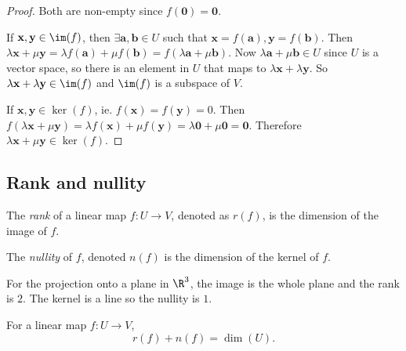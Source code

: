 \documentclass[a4paper]{article}
\begin{document}
\begin{proof}
  Both are non-empty since $f(\mathbf{0}) = \mathbf{0}$.

  If $\mathbf{x, y}\in \im (f)$, then $\exists \mathbf{a, b}\in U$ such that $\mathbf{x} = f(\mathbf{a}), \mathbf{y} = f(\mathbf{b})$.  Then $\lambda \mathbf{x} + \mu\mathbf {y} = \lambda f(\mathbf{a}) + \mu f(\mathbf{b}) = f(\lambda\mathbf{a} + \mu\mathbf{b})$. Now $\lambda\mathbf{a} + \mu\mathbf{b}\in U$ since $U$ is a vector space, so there is an element in $U$ that maps to $\lambda\mathbf{x}+ \lambda\mathbf{y}$. So $\lambda\mathbf{x}+ \lambda\mathbf{y}\in \im (f)$ and $\im (f)$ is a subspace of $V$.

  If $\mathbf{x, y}\in \ker(f)$, ie. $f(\mathbf{x}) = f(\mathbf {y}) = 0$. Then $f(\lambda\mathbf{x} + \mu\mathbf{y}) = \lambda f(\mathbf{x}) + \mu f(\mathbf{y}) = \lambda \mathbf{0} + \mu\mathbf{0} = \mathbf{0}$. Therefore $\lambda\mathbf{x}+ \mu\mathbf{y} \in \ker (f)$.
\end{proof}

\subsection{Rank and nullity}
\begin{defi}
  The \emph{rank} of a linear map $f: U\to V$, denoted as $r(f)$, is the dimension of the image of $f$.
\end{defi}

\begin{defi}
  The \emph{nullity} of $f$, denoted $n(f)$ is the dimension of the kernel of $f$.
\end{defi}

\begin{eg}
  For the projection onto a plane in $\R^3$, the image is the whole plane and the rank is $2$. The kernel is a line so the nullity is $1$.
\end{eg}

\begin{thm}
  For a linear map $f: U \to V$,
  \[
    r(f) + n(f) = \dim (U).
  \]
\end{thm}
\end{document}
